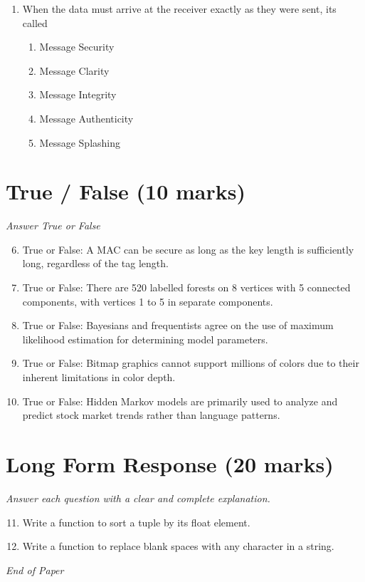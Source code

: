 \documentclass[12pt]{article}
\begin{document}
\begin{enumerate}[label=\arabic*.]
\begin{enumerate}[label=(\alph*)]
    \item Prints the absolute value of the difference of two numbers
    \item Prints out the result of multiplying the two numbers
    \item Prints the second number twice
    \item Calculates the difference of two numbers
    \item Calculates the sum of two numbers
\end{enumerate}
\item When the data must arrive at the receiver exactly as they were sent, its called
\begin{enumerate}[label=(\alph*)]
    \item Message Security
    \item Message Clarity
    \item Message Integrity
    \item Message Authenticity
    \item Message Splashing
\end{enumerate}
\end{enumerate}

\section*{True / False (10 marks)}
\textit{Answer True or False}
\begin{enumerate}[label=\arabic*.]
\setcounter{enumi}{5}
\item True or False: A MAC can be secure as long as the key length is sufficiently long, regardless of the tag length.
\item True or False: There are 520 labelled forests on 8 vertices with 5 connected components, with vertices 1 to 5 in separate components.
\item True or False: Bayesians and frequentists agree on the use of maximum likelihood estimation for determining model parameters.
\item True or False: Bitmap graphics cannot support millions of colors due to their inherent limitations in color depth.
\item True or False: Hidden Markov models are primarily used to analyze and predict stock market trends rather than language patterns.
\end{enumerate}

\section*{Long Form Response (20 marks)}
\textit{Answer each question with a clear and complete explanation.}
\begin{enumerate}[label=\arabic*.]
\setcounter{enumi}{10}
\item Write a function to sort a tuple by its float element.
\item Write a function to replace blank spaces with any character in a string.
\end{enumerate}

\vfill
\noindent\textit{End of Paper}
\end{document}
